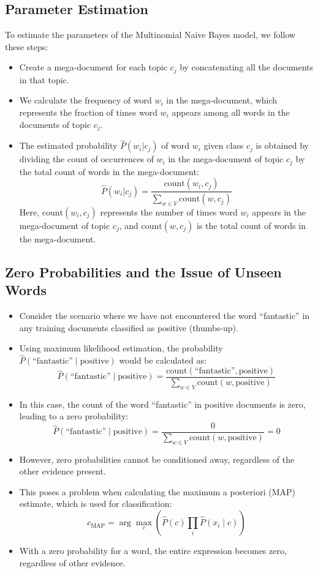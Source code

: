 \subsection{Parameter Estimation}

To estimate the parameters of the Multinomial Naive Bayes model, we follow these steps:

\begin{itemize}
  \item Create a mega-document for each topic $c_j$ by concatenating all the documents in that topic.
  \item We calculate the frequency of word $w_i$ in the mega-document, which represents the fraction of times word $w_i$ appears among all words in the documents of topic $c_j$.
  \item The estimated probability $\hat{P}(w_i | c_j)$ of word $w_i$ given class $c_j$ is obtained by dividing the count of occurrences of $w_i$ in the mega-document of topic $c_j$ by the total count of words in the mega-document:
  \[
  \hat{P}(w_i | c_j) = \frac{{\text{{count}}(w_i, c_j)}}{\sum_{w\in V}{\text{{count}}(w, c_j)}}
  \]
  Here, $\text{{count}}(w_i, c_j)$ represents the number of times word $w_i$ appears in the mega-document of topic $c_j$, and $\text{{count}}(w, c_j)$ is the total count of words in the mega-document.
\end{itemize}


\subsection{Zero Probabilities and the Issue of Unseen Words}
\begin{itemize}
    \item Consider the scenario where we have not encountered the word ``fantastic'' in any training documents classified as positive (thumbs-up).
    \item Using maximum likelihood estimation, the probability $\hat{P}(\text{``fantastic''} \mid \text{positive})$ would be calculated as:
    \[
    \hat{P}(\text{``fantastic''} \mid \text{positive}) = \frac{\text{count}(\text{``fantastic''}, \text{positive})}{\sum_{w \in V} \text{count}(w, \text{positive})}
    \]
    \item In this case, the count of the word ``fantastic'' in positive documents is zero, leading to a zero probability:
    \[
    \hat{P}(\text{``fantastic''} \mid \text{positive}) = \frac{0}{\sum_{w \in V} \text{count}(w, \text{positive})} = 0
    \]
    \item However, zero probabilities cannot be conditioned away, regardless of the other evidence present.
    \item This poses a problem when calculating the maximum a posteriori (MAP) estimate, which is used for classification:
    \[
    c_{\text{MAP}} = \arg\max_c \left(\hat{P}(c) \prod_{i} \hat{P}(x_i \mid c)\right)
    \]
    \item With a zero probability for a word, the entire expression becomes zero, regardless of other evidence.
\end{itemize}




